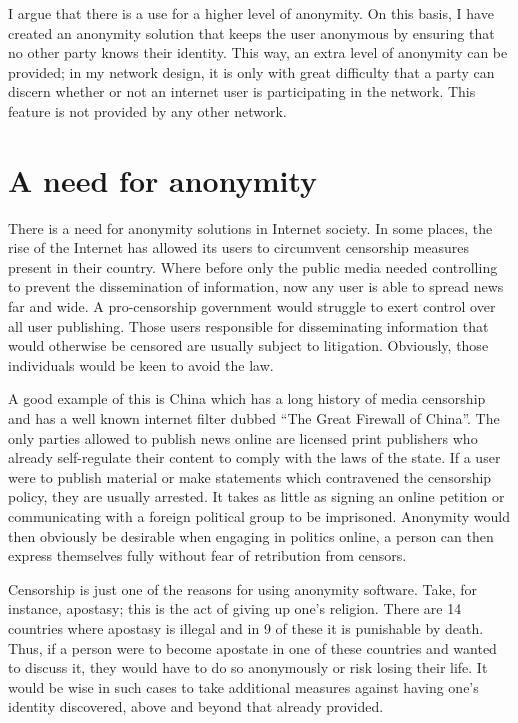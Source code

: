 \documentclass[ %
                    author={Luke Murray},
                supervisor={Dr. Simon Hollis},
                     title={Shadow Peer-to-Peer Networks},
                  subtitle={},
                    degree={MEng},
                      year={2013} ]{thesis}
\begin{document}
I argue that there is a use for a higher level of anonymity. On this basis, I have created an anonymity solution that keeps the user anonymous by ensuring that no other party knows their identity. This way, an extra level of anonymity can be provided; in my network design, it is only with great difficulty that a party can discern whether or not an internet user is participating in the network. This feature is not provided by any other network.


\section{A need for anonymity}

There is a need for anonymity solutions in Internet society. In some places, the rise of the Internet has allowed its users to circumvent censorship measures present in their country. Where before only the public media needed controlling to prevent the dissemination of information, now any user is able to spread news far and wide. A pro-censorship government would struggle to exert control over all user publishing. Those users responsible for disseminating information that would otherwise be censored are usually subject to litigation. Obviously, those individuals would be keen to avoid the law.

A good example of this is China which has a long history of media censorship and has a well known internet filter dubbed ``The Great Firewall of China''. The only parties allowed to publish news online are licensed print publishers who already self-regulate their content to comply with the laws of the state. If a user were to publish material or make statements which contravened the censorship policy, they are usually arrested. It takes as little as signing an online petition or communicating with a foreign political group to be imprisoned. Anonymity would then obviously be desirable when engaging in politics online, a person can then express themselves fully without fear of retribution from censors.

Censorship is just one of the reasons for using anonymity software. Take, for instance, apostasy; this is the act of giving up one's religion. There are 14 countries where apostasy is illegal and in 9 of these it is punishable by death. Thus, if a person were to become apostate in one of these countries and wanted to discuss it, they would have to do so anonymously or risk losing their life. It would be wise in such cases to take additional measures against having one's identity discovered, above and beyond that already provided.
\end{document}
